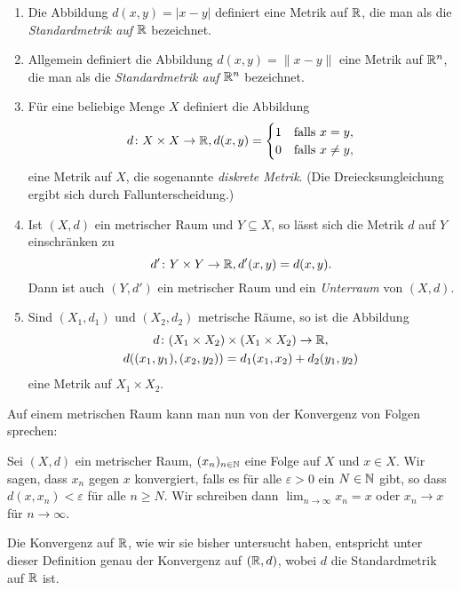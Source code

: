 \documentclass[a4paper,10pt]{article}
\begin{document}
\begin{bsp}
 \begin{enumerate}
  \item
   Die Abbildung $d(x,y) = |x-y|$ definiert eine Metrik auf $\mathbb{R}$, die man als die \emph{Standardmetrik auf $\mathbb{R}$} bezeichnet.
  \item
   Allgemein definiert die Abbildung $d(x,y) = \|x-y\|$ eine Metrik auf $\mathbb{R}^n$, die man als die \emph{Standardmetrik auf $\mathbb{R}^n$} bezeichnet.
  \item
   Für eine beliebige Menge $X$ definiert die Abbildung
   \[
    d \colon X \times X \to \mathbb{R},
    d(x,y) =
    \begin{cases}
     1 & \text{falls $x = y$}, \\
     0 & \text{falls $x \neq y$},
    \end{cases}
   \]
   eine Metrik auf $X$, die sogenannte \emph{diskrete Metrik}. (Die Dreiecksungleichung ergibt sich durch Fallunterscheidung.)
  \item
   Ist $(X,d)$ ein metrischer Raum und $Y \subseteq X$, so lässt sich die Metrik $d$ auf $Y$ einschränken zu
   \[
    d' \colon Y \times Y \to \mathbb{R}, d'(x,y) = d(x,y).
   \]
   Dann ist auch $(Y,d')$ ein metrischer Raum und ein \emph{Unterraum} von $(X,d)$.
  \item
   Sind $(X_1, d_1)$ und $(X_2, d_2)$ metrische Räume, so ist die Abbildung
   \begin{gather*}
    d \colon (X_1 \times X_2) \times (X_1 \times X_2) \to \mathbb{R}, \\
    d((x_1, y_1), (x_2, y_2)) = d_1(x_1, x_2) + d_2(y_1, y_2)
   \end{gather*}
   eine Metrik auf $X_1 \times X_2$.
 \end{enumerate}
\end{bsp}


Auf einem metrischen Raum kann man nun von der Konvergenz von Folgen sprechen:


\begin{defi}
 Sei $(X,d)$ ein metrischer Raum, $(x_n)_{n \in \mathbb{N}}$ eine Folge auf $X$ und $x \in X$. Wir sagen, dass $x_n$ gegen $x$ konvergiert, falls es für alle $\varepsilon > 0$ ein $N \in \mathbb{N}$ gibt, so dass $d(x, x_n) < \varepsilon$ für alle $n \geq N$. Wir schreiben dann $\lim_{n \to \infty} x_n = x$ oder $x_n \to x$ für $n \to \infty$.
\end{defi}


Die Konvergenz auf $\mathbb{R}$, wie wir sie bisher untersucht haben, entspricht unter dieser Definition genau der Konvergenz auf $(\mathbb{R},d)$, wobei $d$ die Standardmetrik auf $\mathbb{R}$ ist.
\end{document}
